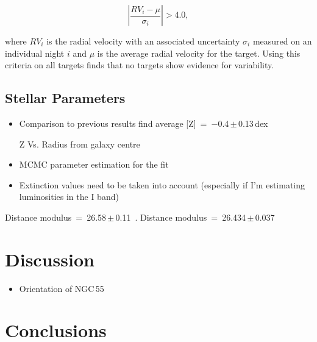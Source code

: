 \begin{equation}
  \left|\frac{RV_i - \mu}{\sigma_i}\right| > 4.0,\label{eq:vary}
\end{equation}

\noindent where $RV_i$ is the radial velocity with an associated uncertainty  $\sigma_i$ measured on an individual night $i$ and $\mu$ is the average radial velocity for the target.
Using this criteria on all targets finds that no targets show evidence for variability.


\subsection{Stellar Parameters} %
\label{sub:stellar_parameters}


\begin{itemize}
    \item Comparison to previous results
    \cite{2012A&A...542A..79C} find average [Z]~=~$-$0.4\,$\pm$\,0.13\,dex
    \item [Z] Vs. Radius from galaxy centre
    \item MCMC parameter estimation for the fit
    \item Extinction values need to be taken into account (especially if I'm estimating luminosities in the I band)
    \end{itemize}

Distance modulus~=~26.58\,$\pm$\,0.11~\citep{2011ApJ...738..150T}.
Distance modulus~=~26.434\,$\pm$\,0.037~\citep{2008ApJ...672..266G}



\section{Discussion} %
\label{sec:discussion}

\begin{itemize}
    \item Orientation of NGC\,55
\end{itemize}

\section{Conclusions} %
\label{sec:conclusions}


